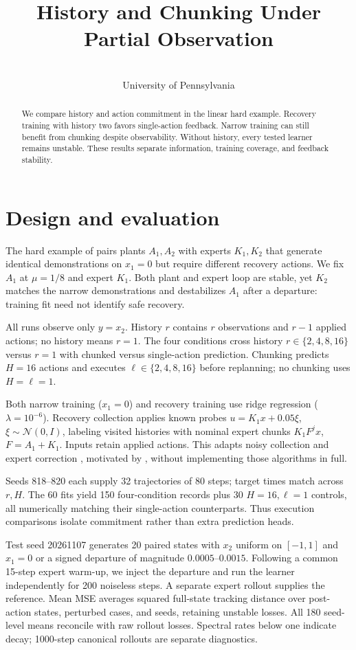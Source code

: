 \documentclass{l4dc2026}
\title[History, Coverage, and Chunking]{History and Chunking Under Partial Observation}
\author{\Name{Nihar Ballamudi}\and\Name{Kyle Horton}\\\addr University of Pennsylvania}
\begin{document}
\maketitle
\begin{abstract}
We compare history and action commitment in the linear hard example. Recovery training with history two favors single-action feedback. Narrow training can still benefit from chunking despite observability. Without history, every tested learner remains unstable. These results separate information, training coverage, and feedback stability.
\end{abstract}

\section{Design and evaluation}
The hard example of \citet{simchowitz2025} pairs plants $A_1,A_2$ with experts $K_1,K_2$ that generate identical demonstrations on $x_1=0$ but require different recovery actions. We fix $A_1$ at $\mu=1/8$ and expert $K_1$. Both plant and expert loop are stable, yet $K_2$ matches the narrow demonstrations and destabilizes $A_1$ after a departure: training fit need not identify safe recovery.

All runs observe only $y=x_2$. History $r$ contains $r$ observations and $r-1$ applied actions; no history means $r=1$. The four conditions cross history $r\in\{2,4,8,16\}$ versus $r=1$ with chunked versus single-action prediction. Chunking predicts $H=16$ actions and executes $\ell\in\{2,4,8,16\}$ before replanning; no chunking uses $H=\ell=1$.

Both narrow training ($x_1=0$) and recovery training use ridge regression ($\lambda=10^{-6}$). Recovery collection applies known probes $u=K_1x+0.05\xi$, $\xi\sim\mathcal N(0,I)$, labeling visited histories with nominal expert chunks $K_1F^jx$, $F=A_1+K_1$. Inputs retain applied actions. This adapts noisy collection and expert correction \citep{laskey2017,ross2011}, motivated by \citet{zhang2025}, without implementing those algorithms in full.

Seeds 818--820 each supply 32 trajectories of 80 steps; target times match across $r,H$. The 60 fits yield 150 four-condition records plus 30 $H=16,\ell=1$ controls, all numerically matching their single-action counterparts. Thus execution comparisons isolate commitment rather than extra prediction heads.

Test seed 20261107 generates 20 paired states with $x_2$ uniform on $[-1,1]$ and $x_1=0$ or a signed departure of magnitude $0.0005$--$0.0015$. Following a common 15-step expert warm-up, we inject the departure and run the learner independently for 200 noiseless steps. A separate expert rollout supplies the reference. Mean MSE averages squared full-state tracking distance over post-action states, perturbed cases, and seeds, retaining unstable losses. All 180 seed-level means reconcile with raw rollout losses. Spectral rates below one indicate decay; 1000-step canonical rollouts are separate diagnostics.
\end{document}
